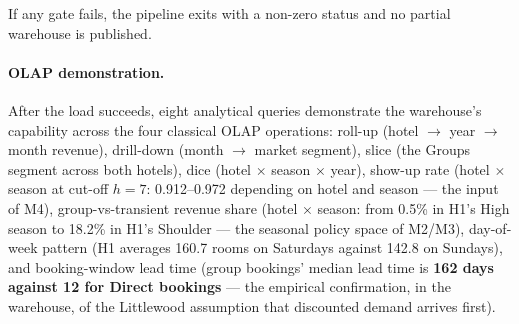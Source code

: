If any gate fails, the pipeline exits with a non-zero status and no partial warehouse is published.

\paragraph{OLAP demonstration.}
After the load succeeds, eight analytical queries demonstrate the warehouse's capability across the four classical OLAP operations: roll-up (hotel $\to$ year $\to$ month revenue), drill-down (month $\to$ market segment), slice (the Groups segment across both hotels), dice (hotel $\times$ season $\times$ year), show-up rate (hotel $\times$ season at cut-off $h = 7$: 0.912--0.972 depending on hotel and season --- the input of M4), group-vs-transient revenue share (hotel $\times$ season: from 0.5\% in H1's High season to 18.2\% in H1's Shoulder --- the seasonal policy space of M2/M3), day-of-week pattern (H1 averages 160.7 rooms on Saturdays against 142.8 on Sundays), and booking-window lead time (group bookings' median lead time is \textbf{162 days against 12 for Direct bookings} --- the empirical confirmation, in the warehouse, of the Littlewood assumption that discounted demand arrives first).
